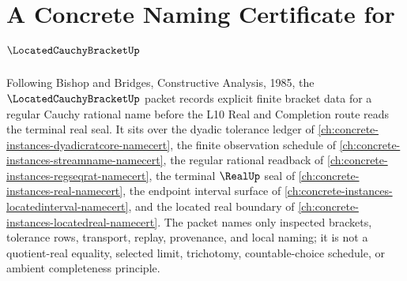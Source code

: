 \chapter{A Concrete Naming Certificate for $\LocatedCauchyBracketUp$}
\label{ch:concrete-instances-located-cauchy-bracket-namecert}

Following Bishop and Bridges, Constructive Analysis, 1985, the $\LocatedCauchyBracketUp$ packet records explicit finite bracket data for a regular Cauchy rational name before the L10 Real and Completion route reads the terminal real seal. It sits over the dyadic tolerance ledger of \autoref{ch:concrete-instances-dyadicratcore-namecert}, the finite observation schedule of \autoref{ch:concrete-instances-streamname-namecert}, the regular rational readback of \autoref{ch:concrete-instances-regseqrat-namecert}, the terminal $\RealUp$ seal of \autoref{ch:concrete-instances-real-namecert}, the endpoint interval surface of \autoref{ch:concrete-instances-locatedinterval-namecert}, and the located real boundary of \autoref{ch:concrete-instances-locatedreal-namecert}. The packet names only inspected brackets, tolerance rows, transport, replay, provenance, and local naming; it is not a quotient-real equality, selected limit, trichotomy, countable-choice schedule, or ambient completeness principle.

